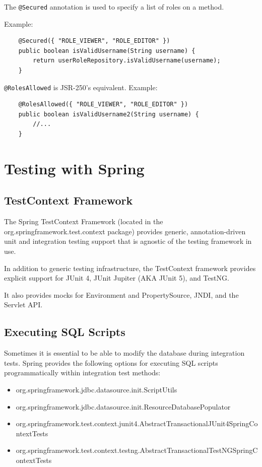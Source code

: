 \documentclass{scrartcl}
\begin{document}
The \lstinline|@Secured| annotation is used to specify a list of roles on a method.

Example:

\begin{lstlisting}
    @Secured({ "ROLE_VIEWER", "ROLE_EDITOR" })
    public boolean isValidUsername(String username) {
        return userRoleRepository.isValidUsername(username);
    }

\end{lstlisting}

\lstinline|@RolesAllowed| is JSR-250’s equivalent. Example:

\begin{lstlisting}
    @RolesAllowed({ "ROLE_VIEWER", "ROLE_EDITOR" })
    public boolean isValidUsername2(String username) {
        //...
    }
\end{lstlisting}

\section{Testing with Spring}

\subsection{TestContext Framework}

The Spring TestContext Framework (located in the org.springframework.test.context package) provides generic, annotation-driven unit and integration testing support that is agnostic of the testing framework in use.

In addition to generic testing infrastructure, the TestContext framework provides explicit support for JUnit 4, JUnit Jupiter (AKA JUnit 5), and TestNG.

It also provides mocks for Environment and PropertySource, JNDI, and the Servlet API.
\subsection{Executing SQL Scripts}

Sometimes it is essential to be able to modify the database during integration tests.
Spring provides the following options for executing SQL scripts programmatically within integration test methods:

\begin{itemize}
    \item org.springframework.jdbc.datasource.init.ScriptUtils
    \item org.springframework.jdbc.datasource.init.ResourceDatabasePopulator
    \item org.springframework.test.context.junit4.AbstractTransactionalJUnit4SpringContextTests
    \item org.springframework.test.context.testng.AbstractTransactionalTestNGSpringContextTests
\end{itemize}
\end{document}
